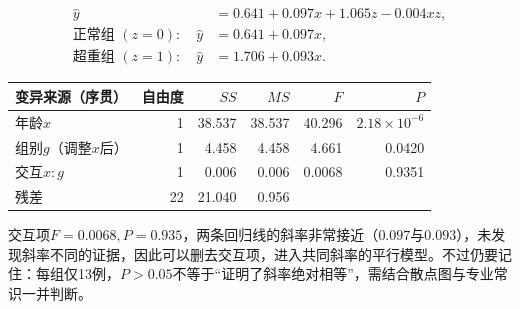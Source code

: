 \begin{align*}
\widehat y&=0.641+0.097x+1.065z-0.004xz,\\
\text{正常组 }(z=0):\quad\widehat y&=0.641+0.097x,\\
\text{超重组 }(z=1):\quad\widehat y&=1.706+0.093x.
\end{align*}
\begin{center}\small\begin{tabular}{lrrrrr}
\toprule 变异来源（序贯）&自由度&$SS$&$MS$&$F$&$P$\\\midrule
年龄$x$&1&38.537&38.537&40.296&$2.18\times10^{-6}$\\
组别$g$（调整$x$后）&1&4.458&4.458&4.661&0.0420\\
交互$x:g$&1&0.006&0.006&0.0068&0.9351\\
残差&22&21.040&0.956&&\\\bottomrule
\end{tabular}\end{center}
交互项$F=0.0068,P=0.935$，两条回归线的斜率非常接近（$0.097$与$0.093$），未发现斜率不同的证据，因此可以删去交互项，进入共同斜率的平行模型。不过仍要记住：每组仅13例，$P>0.05$不等于“证明了斜率绝对相等”，需结合散点图与专业常识一并判断。

